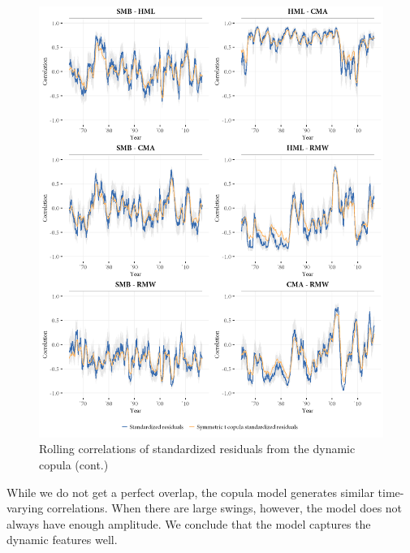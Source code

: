 \begin{figure}[p]
  \ContinuedFloat
  \centering
  \includegraphics[width=\textwidth]{graphics/rolling_simulated2.png}
  \footnotesize
  \caption{Rolling correlations of standardized residuals from the dynamic copula (cont.)}
\end{figure}

While we do not get a perfect overlap, the copula model generates similar time-varying correlations. When there are large swings, however, the model does not always have enough amplitude. We conclude that the model captures the dynamic features well.
